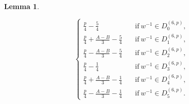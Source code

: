 \documentclass[letter]{ieice}
\newtheorem{sec3_lemma4}[sec3_lemma1]{Lemma}
\begin{document}
\begin{sec3_lemma4}
\begin{itemize}
\begin{equation*}
\begin{cases}
\frac{p}{4}-\frac{5}{4}&\quad \mbox{if}\ w^{-1} \in  D_{0}^{(6,p)},\\
\frac{p}{4}+\frac{A-B}{3}-\frac{5}{4}&\quad \mbox{if}\ w^{-1} \in  D_{1}^{(6,p)},\\
\frac{p}{4}-\frac{A-B}{3}-\frac{5}{4}&\quad \mbox{if}\ w^{-1} \in  D_{2}^{(6,p)},\\
\frac{p}{4}-\frac{1}{4}&\quad \mbox{if}\ w^{-1} \in  D_{3}^{(6,p)},\\
\frac{p}{4}+\frac{A-B}{3}-\frac{1}{4}&\quad \mbox{if}\ w^{-1} \in  D_{4}^{(6,p)},\\
\frac{p}{4}-\frac{A-B}{3}-\frac{1}{4}&\quad \mbox{if}\ w^{-1} \in  D_{5}^{(6,p)}.
\end{cases}
\end{equation*}
\end{itemize}
\end{sec3_lemma4}            
\end{document}
